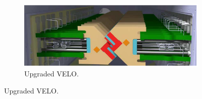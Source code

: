 \begin{figure}[!htb]
    \centering
    \begin{subfigure}[t]{0.72\textwidth}
        \centering
        \includegraphics[width=\textwidth]{./figs-lhcb-upgrade-overview/tracking/velo_upgrade.pdf}
        \caption{Upgraded VELO.}
        \label{fig:velo-upgrade}
    \end{subfigure}


\end{figure}
